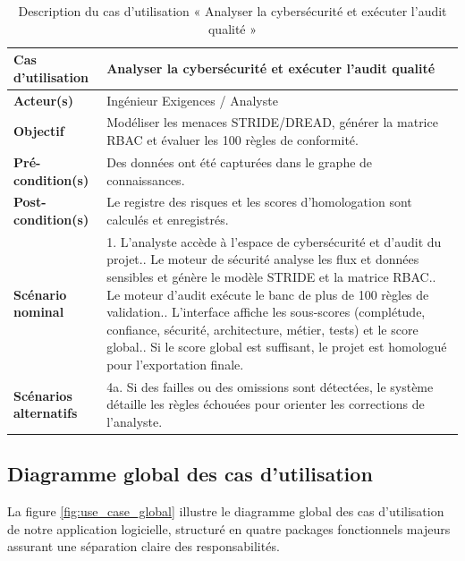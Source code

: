 \begin{table}[H]
\centering
\caption{Description du cas d'utilisation « Analyser la cybersécurité et exécuter l'audit qualité »}
\label{tab:uc_security_audit}
\begin{tabularx}{\textwidth}{|l|X|}
\hline
\rowcolor{focpgreen!18}
\textbf{Cas d'utilisation} & Analyser la cybersécurité et exécuter l'audit qualité \\
\hline
\textbf{Acteur(s)} & Ingénieur Exigences / Analyste \\
\hline
\textbf{Objectif} & Modéliser les menaces STRIDE/DREAD, générer la matrice RBAC et évaluer les 100 règles de conformité. \\
\hline
\textbf{Pré-condition(s)} & Des données ont été capturées dans le graphe de connaissances. \\
\hline
\textbf{Post-condition(s)} & Le registre des risques et les scores d'homologation sont calculés et enregistrés. \\
\hline
\textbf{Scénario nominal} & 
1. L'analyste accède à l'espace de cybersécurité et d'audit du projet.\newline
2. Le moteur de sécurité analyse les flux et données sensibles et génère le modèle STRIDE et la matrice RBAC.\newline
3. Le moteur d'audit exécute le banc de plus de 100 règles de validation.\newline
4. L'interface affiche les sous-scores (complétude, confiance, sécurité, architecture, métier, tests) et le score global.\newline
5. Si le score global est suffisant, le projet est homologué pour l'exportation finale. \\
\hline
\textbf{Scénarios alternatifs} & 
4a. Si des failles ou des omissions sont détectées, le système détaille les règles échouées pour orienter les corrections de l'analyste. \\
\hline
\end{tabularx}
\end{table}

\subsection{Diagramme global des cas d'utilisation}

La figure \ref{fig:use_case_global} illustre le diagramme global des cas d'utilisation de notre application logicielle, structuré en quatre packages fonctionnels majeurs assurant une séparation claire des responsabilités.

